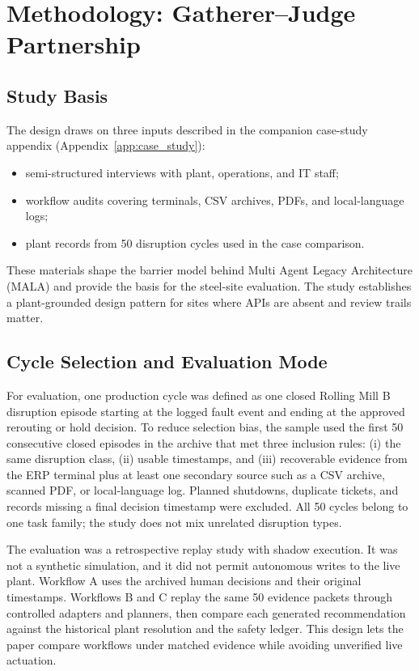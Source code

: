 \documentclass[conference]{IEEEtran}
\newcommand{\MALA}{Multi Agent Legacy Architecture (MALA)}
\begin{document}
\section{Methodology: Gatherer--Judge Partnership}

\subsection{Study Basis}

The design draws on three inputs described in the companion case-study appendix (Appendix~\ref{app:case_study}):
\begin{itemize}
  \item semi-structured interviews with plant, operations, and IT staff;
  \item workflow audits covering terminals, CSV archives, PDFs, and local-language logs;
  \item plant records from 50 disruption cycles used in the case comparison.
\end{itemize}

These materials shape the barrier model behind \MALA{} and provide the basis for the steel-site evaluation. The study establishes a plant-grounded design pattern for sites where APIs are absent and review trails matter.

\subsection{Cycle Selection and Evaluation Mode}

For evaluation, one production cycle was defined as one closed Rolling Mill B disruption episode starting at the logged fault event and ending at the approved rerouting or hold decision. To reduce selection bias, the sample used the first 50 consecutive closed episodes in the archive that met three inclusion rules: (i) the same disruption class, (ii) usable timestamps, and (iii) recoverable evidence from the ERP terminal plus at least one secondary source such as a CSV archive, scanned PDF, or local-language log. Planned shutdowns, duplicate tickets, and records missing a final decision timestamp were excluded. All 50 cycles belong to one task family; the study does not mix unrelated disruption types.

The evaluation was a retrospective replay study with shadow execution. It was not a synthetic simulation, and it did not permit autonomous writes to the live plant. Workflow A uses the archived human decisions and their original timestamps. Workflows B and C replay the same 50 evidence packets through controlled adapters and planners, then compare each generated recommendation against the historical plant resolution and the safety ledger. This design lets the paper compare workflows under matched evidence while avoiding unverified live actuation.
\end{document}
